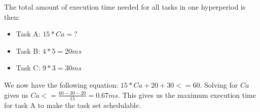     The total amount of execution time needed for all tasks in one hyperperiod is then:
    \begin{itemize}
        \item Task A: $15*Ca =?$
        \item Task B: $4*5 = 20ms$
        \item Task C: $9*3 = 30ms$
    \end{itemize}

    We now have the following equation: $15*Ca + 20 + 30 <= 60$. Solving for $Ca$ gives us $Ca <= \frac{60-30-20}{15} = 0.67ms$. This gives us the maximum execution time for task A to make the task set schedulable.\\
